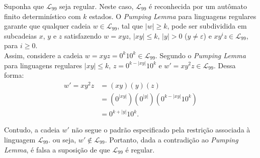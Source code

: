 \documentclass[12pt]{article}
\def\myling{{99}} %
\begin{document}
%
\begin{tcolorbox}[rounded corners, colback=yellow!5, colframe=red!40!black]
Suponha que $\mathcal{L}_{\myling}$ seja regular. Neste caso, $\mathcal{L}_{\myling}$ é reconhecida por um autômato finito determinístico com $k$ estados. O \emph{Pumping Lemma} para linguagens regulares garante que qualquer cadeia $w\in \mathcal{L}_{\myling}$, tal que $|w|\geqslant k$, pode ser subdividida em subcadeias $x$, $y$ e $z$ satisfazendo $w=xyz$, $|xy|\leqslant k$, $|y|>0$ ($y\neq\varepsilon$) e $xy^iz\in \mathcal{L}_{\myling}$, para $i\geqslant 0$.\\

Assim, considere a cadeia $w=xyz=0^k10^k\in \mathcal{L}_{\myling}$. Segundo o \emph{Pumping Lemma} para linguagens regulares $|xy|\leqslant k$, $z=0^{k-|xy|}10^k$ e $w'= xy^2z\in \mathcal{L}_{\myling}$. Dessa forma:
\begin{align*}
 w' = xy^2z &= (xy)(y)(z)\\
            &= (0^{|xy|})(0^{|y|})(0^{k-|xy|}10^k)\\
            &= 0^{k+|y|}10^k.
\end{align*}

Contudo, a cadeia $w'$ não segue o padrão especificado pela restrição associada à linguagem $\mathcal{L}_{\myling}$. ou seja, $w'\notin\mathcal{L}_{\myling}$. Portanto, dada a contradição ao \emph{Pumping Lemma}, é falsa a suposição de que $\mathcal{L}_{\myling}$ é regular.
\end{tcolorbox}
%
\end{document}
